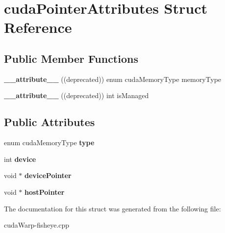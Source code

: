 \hypertarget{structcudaPointerAttributes}{}\section{cuda\+Pointer\+Attributes Struct Reference}
\label{structcudaPointerAttributes}
\subsection*{Public Member Functions}
\begin{DoxyCompactItemize}
\item 
{\bfseries \+\_\+\+\_\+attribute\+\_\+\+\_\+} ((deprecated)) enum cuda\+Memory\+Type memory\+Type\hypertarget{structcudaPointerAttributes_aa58b84ef99d35d38ca7d71c611071688}{}\label{structcudaPointerAttributes_aa58b84ef99d35d38ca7d71c611071688}

\item 
{\bfseries \+\_\+\+\_\+attribute\+\_\+\+\_\+} ((deprecated)) int is\+Managed\hypertarget{structcudaPointerAttributes_ad376dda73dd1d022a85fd2ec674733f6}{}\label{structcudaPointerAttributes_ad376dda73dd1d022a85fd2ec674733f6}

\end{DoxyCompactItemize}
\subsection*{Public Attributes}
\begin{DoxyCompactItemize}
\item 
enum cuda\+Memory\+Type {\bfseries type}\hypertarget{structcudaPointerAttributes_a91ef95dac597cc710558dabbc8b9ae38}{}\label{structcudaPointerAttributes_a91ef95dac597cc710558dabbc8b9ae38}

\item 
int {\bfseries device}\hypertarget{structcudaPointerAttributes_a20015540684b0c85e0debf64923bedec}{}\label{structcudaPointerAttributes_a20015540684b0c85e0debf64923bedec}

\item 
void $\ast$ {\bfseries device\+Pointer}\hypertarget{structcudaPointerAttributes_a9edc9782e1ee337072994780fd3b675f}{}\label{structcudaPointerAttributes_a9edc9782e1ee337072994780fd3b675f}

\item 
void $\ast$ {\bfseries host\+Pointer}\hypertarget{structcudaPointerAttributes_a19cbae18cd685096287e41cce1c9a087}{}\label{structcudaPointerAttributes_a19cbae18cd685096287e41cce1c9a087}

\end{DoxyCompactItemize}


The documentation for this struct was generated from the following file\+:\begin{DoxyCompactItemize}
\item 
cuda\+Warp-\/fisheye.\+cpp\end{DoxyCompactItemize}
